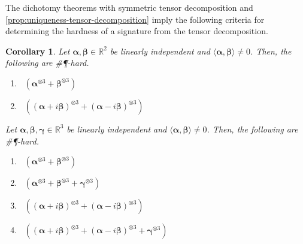 \documentclass[11pt]{article}
\newtheorem{corollary}[theorem]{Corollary}
\DeclareMathOperator{\holbs}{Holant^*_2}
\DeclareMathOperator{\holts}{Holant^*_3}
\newcommand{\sph}{\#\P-hard\xspace}
\newcommand{\teh}{^{\otimes 3}}
\begin{document}
The dichotomy theorems with symmetric tensor decomposition and \cref{prop:uniqueness-tensor-decomposition} imply the following criteria for determining the hardness of a signature from the tensor decomposition.
\begin{corollary}\label{cor:non-orthogonal-linearly-independent-hard}
  Let $\boldsymbol{\alpha}, \boldsymbol{\beta} \in \mathbb{R}^2$ be linearly independent and $\langle \boldsymbol{\alpha}, \boldsymbol{\beta} \rangle \ne 0$.
  Then, the following are \sph.
  \begin{enumerate}
    \item $\holbs(\boldsymbol{\alpha}\teh + \boldsymbol{\beta}\teh)$
    \item $\holbs( (\boldsymbol{\alpha} + i \boldsymbol{\beta})\teh + (\boldsymbol{\alpha} - i \boldsymbol{\beta})\teh)$
  \end{enumerate}
Let $\boldsymbol{\alpha}, \boldsymbol{\beta}, \boldsymbol{\gamma} \in \mathbb{R}^3$ be linearly independent and $\langle \boldsymbol{\alpha}, \boldsymbol{\beta} \rangle \ne 0$.
Then, the following are \sph.
\begin{enumerate}
\item $\holts(\boldsymbol{\alpha}\teh + \boldsymbol{\beta}\teh)$
  \item $\holts(\boldsymbol{\alpha}\teh + \boldsymbol{\beta}\teh + \boldsymbol{\gamma}\teh)$
  \item $\holts( (\boldsymbol{\alpha} + i \boldsymbol{\beta})\teh + (\boldsymbol{\alpha} - i \boldsymbol{\beta})\teh)$
  \item $\holts( (\boldsymbol{\alpha} + i \boldsymbol{\beta})\teh + (\boldsymbol{\alpha} - i \boldsymbol{\beta})\teh + \boldsymbol{\gamma} \teh)$ 
\end{enumerate}
\end{corollary}
\end{document}
